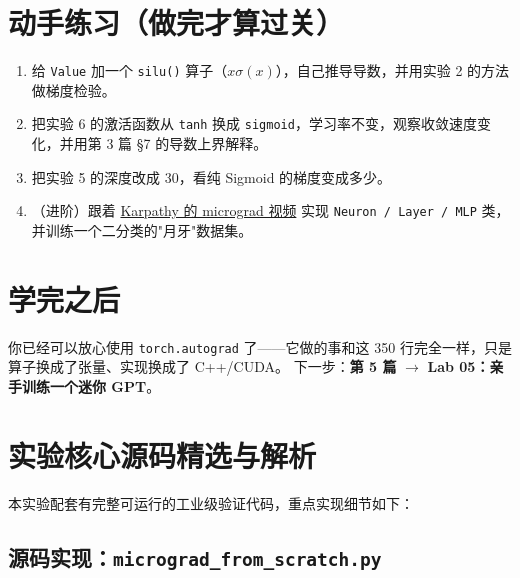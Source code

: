 \section{动手练习（做完才算过关）}

\begin{enumerate}
  \item 给 \texttt{Value} 加一个 \texttt{silu()} 算子（$x\sigma(x)$），自己推导导数，并用实验 2 的方法做梯度检验。
  \item 把实验 6 的激活函数从 \texttt{tanh} 换成 \texttt{sigmoid}，学习率不变，观察收敛速度变化，并用第 3 篇 §7 的导数上界解释。
  \item 把实验 5 的深度改成 30，看纯 Sigmoid 的梯度变成多少。
  \item （进阶）跟着 \href{https://karpathy.ai/zero-to-hero.html}{Karpathy 的 micrograd 视频} 实现 \texttt{Neuron / Layer / MLP} 类，并训练一个二分类的"月牙"数据集。
\end{enumerate}

\section{学完之后}

你已经可以放心使用 \texttt{torch.autograd} 了——它做的事和这 350 行完全一样，只是算子换成了张量、实现换成了 C++/CUDA。
下一步：\textbf{第 5 篇} $\rightarrow$ \textbf{Lab 05：亲手训练一个迷你 GPT}。


\section{实验核心源码精选与解析}

本实验配套有完整可运行的工业级验证代码，重点实现细节如下：


\subsection{源码实现：\texttt{micrograd\_from\_scratch.py}}




